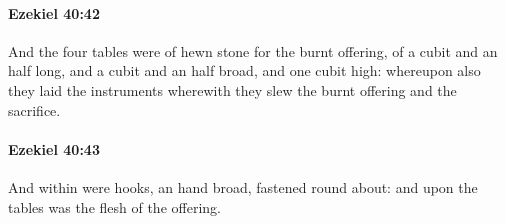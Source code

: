 		\paragraph{Ezekiel 40:42} %
			\label{EZEKIEL-40-42}

			And the four tables were of hewn stone for the burnt offering, of a cubit and an half long, and a cubit and an half broad, and one cubit high: whereupon also they laid the instruments wherewith they slew the burnt offering and the sacrifice.


		\paragraph{Ezekiel 40:43} %
			\label{EZEKIEL-40-43}

			And within were hooks, an hand broad, fastened round about: and upon the tables was the flesh of the offering.


